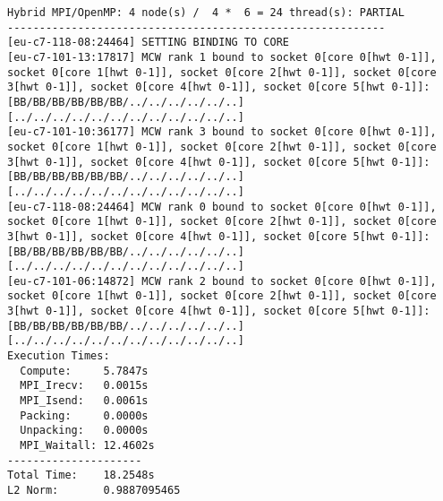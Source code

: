 \begin{lstlisting}[basicstyle=\tiny, frame=single, caption={Task 2: Collected Euler outputs.}, label={lst:1}]
Hybrid MPI/OpenMP: 4 node(s) /  4 *  6 = 24 thread(s): PARTIAL 
-----------------------------------------------------------
[eu-c7-118-08:24464] SETTING BINDING TO CORE
[eu-c7-101-13:17817] MCW rank 1 bound to socket 0[core 0[hwt 0-1]], socket 0[core 1[hwt 0-1]], socket 0[core 2[hwt 0-1]], socket 0[core 3[hwt 0-1]], socket 0[core 4[hwt 0-1]], socket 0[core 5[hwt 0-1]]: [BB/BB/BB/BB/BB/BB/../../../../../..][../../../../../../../../../../../..]
[eu-c7-101-10:36177] MCW rank 3 bound to socket 0[core 0[hwt 0-1]], socket 0[core 1[hwt 0-1]], socket 0[core 2[hwt 0-1]], socket 0[core 3[hwt 0-1]], socket 0[core 4[hwt 0-1]], socket 0[core 5[hwt 0-1]]: [BB/BB/BB/BB/BB/BB/../../../../../..][../../../../../../../../../../../..]
[eu-c7-118-08:24464] MCW rank 0 bound to socket 0[core 0[hwt 0-1]], socket 0[core 1[hwt 0-1]], socket 0[core 2[hwt 0-1]], socket 0[core 3[hwt 0-1]], socket 0[core 4[hwt 0-1]], socket 0[core 5[hwt 0-1]]: [BB/BB/BB/BB/BB/BB/../../../../../..][../../../../../../../../../../../..]
[eu-c7-101-06:14872] MCW rank 2 bound to socket 0[core 0[hwt 0-1]], socket 0[core 1[hwt 0-1]], socket 0[core 2[hwt 0-1]], socket 0[core 3[hwt 0-1]], socket 0[core 4[hwt 0-1]], socket 0[core 5[hwt 0-1]]: [BB/BB/BB/BB/BB/BB/../../../../../..][../../../../../../../../../../../..]
Execution Times:
  Compute:     5.7847s
  MPI_Irecv:   0.0015s
  MPI_Isend:   0.0061s
  Packing:     0.0000s
  Unpacking:   0.0000s
  MPI_Waitall: 12.4602s
---------------------
Total Time:    18.2548s
L2 Norm:       0.9887095465



\end{lstlisting}
